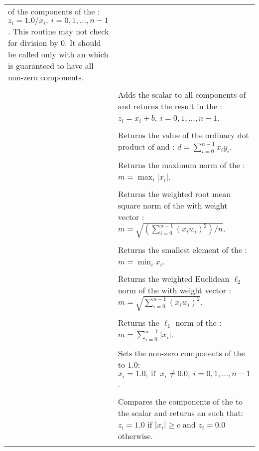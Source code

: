 \begin{supertabular}{|p{\colone}|p{\coltwo}|}
of the components of the  :
$z_i = 1.0 /  x_i  , \: i=0,1,\ldots,n-1$. This routine
may not check for division by $0$. It should be called only with an 
 which is guaranteed to have all non-zero components.
\\
%
 &  \\
& Adds the scalar  to all components of  and returns the
result in the  :
$z_i = x_i + b , \: i=0,1,\ldots,n-1$.
\\
%
 &  \\
& Returns the value of the ordinary dot product of  and :
$d=\sum_{i=0}^{n-1} x_i y_i$.
\\
%
 &  \\
& Returns the maximum norm of the  :
$m = \max_{i} | x_i |$.
\\
%
 &  \\
& Returns the weighted root mean square norm of the   with
weight vector :
$m = \sqrt{\left( \sum_{i=0}^{n-1} (x_i w_i)^2 \right) / n}$.
\\
%
 &  \\
& Returns the smallest element of the  :
$m = \min_i x_i $.
\\
%
 &  \\
& Returns the weighted Euclidean $\ell_2$ norm of the  
with weight vector : 
$m = \sqrt{\sum_{i=0}^{n-1} (x_i w_i)^2}$.
\\
%
 &  \\
& Returns the $\ell_1$ norm of the  :
$m = \sum_{i=0}^{n-1} | x_i |$.
\\
%
 &  \\
& Sets the non-zero components of the  to $1.0$:
$x_i = 1.0, \: \text{if } \: x_i \ne 0.0, \: i=0,1,\ldots,n-1$.
\\
%
 &  \\
& Compares the components of the   to the scalar
 and returns an   such that:
$z_i = 1.0$ if $| x_i | \ge c$ and $z_i = 0.0$ otherwise.
\\
%
 &  \\

\end{supertabular}
